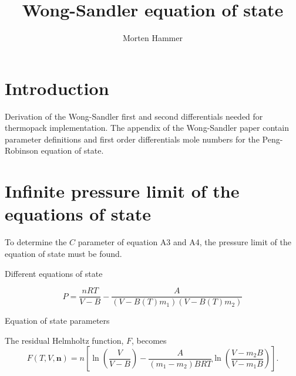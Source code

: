 \documentclass[internal,english]{sintefmemo2012}
\title{Wong-Sandler equation of state}
\author{Morten Hammer}
\newcommand*{\vektor}[1]{\boldsymbol{#1}}%
\newcommand{\wrpt}{\text{with respect to}\xspace}
\begin{document}
\frontmatter
\tableofcontents
\section{Introduction}
Derivation of the Wong-Sandler first and second differentials needed
for thermopack implementation\cite{Wong1992}. The appendix of the
Wong-Sandler paper contain parameter definitions and first order
differentials \wrpt mole numbers for the Peng-Robinson equation of state. 
\section{Infinite pressure limit of the equations of state}
To determine the $C$ parameter of equation A3 and A4, the pressure
limit of the equation of state must be found.

\begin{table}[htb]
\begin{minipage}[l]{0.58\linewidth}
\caption{Different equations of state}
\vspace{-3mm}

\label{tab:eos}
\end{minipage}
\end{table}

\begin{equation}
P=\frac{nRT}{V-B}-\frac{A}{\left(V-B(T)m_1\right)\left(V-B(T)m_2\right)}
\label{eq:eosg}
\end{equation}

\begin{table}[htb]
\begin{minipage}[l]{0.58\linewidth}
\caption{Equation of state parameters}
\vspace{-3mm}

\label{tab:eos2}
\end{minipage}
\end{table}

The residual Helmholtz function, $F$, becomes
\begin{equation}
  F(T,V,\vektor{n})=
  n\left[\ln\left(\frac{V}{V-B}\right)-\frac{A}{\left(m_1-m_2\right)BRT}\ln\left(\frac{V-m_2B}{V-m_1B}\right) \right].
\end{equation}
\end{document}

